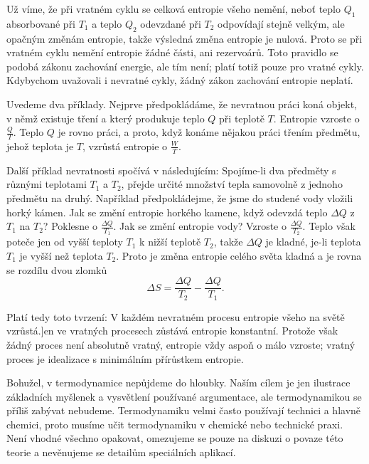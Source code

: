     Už víme, že při vratném cyklu se celková entropie všeho nemění, neboť teplo \(Q_1\) absorbované
    při \(T_1\) a teplo \(Q_2\) odevzdané při \(T_2\) odpovídají stejně velkým, ale opačným změnám
    entropie, takže výsledná změna entropie je nulová. Proto se při vratném cyklu nemění entropie
    žádné části, ani rezervoárů. Toto pravidlo se podobá zákonu zachování energie, ale tím není;
    platí totiž pouze pro vratné cykly. Kdybychom uvažovali i nevratné cykly, žádný zákon zachování
    entropie neplatí.

    Uvedeme dva příklady. Nejprve předpokládáme, že nevratnou práci koná objekt, v němž existuje
    tření a který produkuje teplo \(Q\) při teplotě \(T\). Entropie vzroste o \(\frac{Q}{T}\). Teplo
    \(Q\) je rovno práci, a proto, když konáme nějakou práci třením předmětu, jehož teplota je
    \(T\), vzrůstá entropie o \(\frac{W}{T}\).

    Další příklad nevratnosti spočívá v následujícím: Spojíme-li dva předměty s různými teplotami
    \(T_1\) a \(T_2\), přejde určité množství tepla samovolně z jednoho předmětu na druhý. Například
    předpokládejme, že jsme do studené vody vložili horký kámen. Jak se změní entropie horkého
    kamene, když odevzdá teplo \( ΔQ\) z \(T_1\) na \(T_2\)? Poklesne o \(\frac{ΔQ}{T_1}\). Jak se
    změní entropie vody? Vzroste o \(\frac{ΔQ}{T_2}\). Teplo však poteče jen od vyšší teploty
    \(T_1\) k nižší teplotě \(T_2\), takže \( ΔQ\)  je kladné, je-li teplota \(T_1\) je vyšší než
    teplota \(T_2\). Proto je změna entropie celého světa kladná a je rovna se rozdílu dvou zlomků
    \begin{equation}\label{fyz:eq708}
      ΔS=\frac{ΔQ}{T_2}−\frac{ΔQ}{T_1}.
    \end{equation}

    Platí tedy toto tvrzení: V každém nevratném procesu entropie všeho na světě vzrůstá.]en ve
    vratných procesech zůstává entropie konstantní. Protože však žádný proces není absolutně vratný,
    entropie vždy aspoň o málo vzroste; vratný proces je idealizace s minimálním přírůstkem
    entropie.

    Bohužel, v termodynamice nepůjdeme do hloubky. Naším cílem je jen ilustrace základních
    myšlenek a vysvětlení používané argumentace, ale termodynamikou se příliš zabývat nebudeme.
    Termodynamiku velmi často používají technici a hlavně chemici, proto musíme učit termodynamiku v
    chemické nebo technické praxi. Není vhodné všechno opakovat, omezujeme se pouze na diskuzi o
    povaze této teorie a nevěnujeme se detailům speciálních aplikací.

